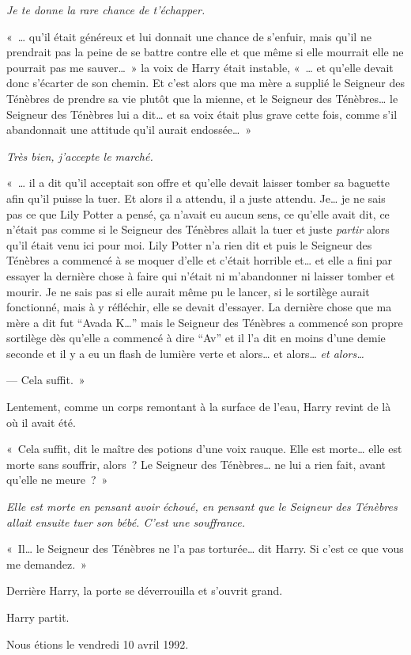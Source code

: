 \emph{Je te donne la rare chance de t'échapper.}

«~… qu'il était généreux et lui donnait une chance de s'enfuir, mais qu'il ne prendrait pas la peine de se battre contre elle et que même si elle mourrait elle ne pourrait pas me sauver…~»
la voix de Harry était instable, «~… et qu'elle devait donc s'écarter de son chemin.
Et c'est alors que ma mère a supplié le Seigneur des Ténèbres de prendre sa vie plutôt que la mienne, et le Seigneur des Ténèbres… le Seigneur des Ténèbres lui a dit… et sa voix était plus grave cette fois, comme s'il abandonnait une attitude qu'il aurait endossée…~»

\emph{Très bien, j'accepte le marché.}

«~… il a dit qu'il acceptait son offre et qu'elle devait laisser tomber sa baguette afin qu'il puisse la tuer.
Et alors il a attendu, il a juste attendu.
Je… je ne sais pas ce que Lily Potter a pensé, ça n'avait eu aucun sens, ce qu'elle avait dit, ce n'était pas comme si le Seigneur des Ténèbres allait la tuer et juste \emph{partir} alors qu'il était venu ici pour moi.
Lily Potter n'a rien dit et puis le Seigneur des Ténèbres a commencé à se moquer d'elle et c'était horrible et… et elle a fini par essayer la dernière chose à faire qui n'était ni m'abandonner ni laisser tomber et mourir.
Je ne sais pas si elle aurait même pu le lancer, si le sortilège aurait fonctionné, mais à y réfléchir, elle se devait d'essayer.
La dernière chose que ma mère a dit fut “Avada K…” mais le Seigneur des Ténèbres a commencé son propre sortilège dès qu'elle a commencé à dire “Av” et il l'a dit en moins d'une demie seconde et il y a eu un flash de lumière verte et alors… et alors…
\emph{et alors…}

--- Cela suffit.~»

Lentement, comme un corps remontant à la surface de l'eau, Harry revint de là où il avait été.

«~Cela suffit, dit le maître des potions d'une voix rauque.
Elle est morte… elle est morte sans souffrir, alors~?
Le Seigneur des Ténèbres… ne lui a rien fait, avant qu'elle ne meure~?~»

\emph{Elle est morte en pensant avoir échoué, en pensant que le Seigneur des Ténèbres allait ensuite tuer son bébé.
C'est une souffrance.}

«~Il… le Seigneur des Ténèbres ne l'a pas torturée… dit Harry.
Si c'est ce que vous me demandez.~»

Derrière Harry, la porte se déverrouilla et s'ouvrit grand.

Harry partit.

Nous étions le vendredi 10 avril 1992.
